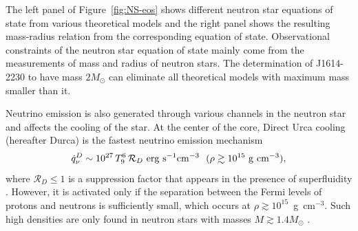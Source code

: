 The left panel of Figure~\ref{fig:NS-eos} shows different neutron star equations of state from various theoretical models and the right panel shows the resulting mass-radius relation from the corresponding equation of state.
Observational constraints of the neutron star equation of state mainly come from the measurements of mass and radius of neutron stars.
The determination of J1614-2230 to have mass $2M_\odot$ \citep{2010Natur.467.1081D} can eliminate all theoretical models with maximum mass smaller than it.

Neutrino emission is also generated through various channels in the neutron star and affects the cooling of the star.
At the center of the core, Direct Urca cooling (hereafter Durca) is the fastest neutrino emission mechanism
%
\begin{equation}
	   \dot{q}_\nu^D\sim 10^{27}\,T_9^6\, \mathcal{R}_D {\rm~erg~s}^{-1}{\rm cm}^{-3} \:\:\: (\rho\gtrsim 10^{15} {\rm~g~cm}^{-3}),
\end{equation}
%
where $\mathcal{R}_D\leq 1$ is a suppression factor that appears in the presence of 
superfluidity \citep{2001PhR...354....1Y}.  
However, it is activated only if the separation between the Fermi levels of protons and neutrons is sufficiently small, which occurs
at $\rho\gtrsim 10^{15}$~g~cm$^{-3}$.
Such high densities are only found in neutron stars with masses  $M \gtrsim 1.4 M_\odot$ \citep{1991PhRvL..66.2701L}.

